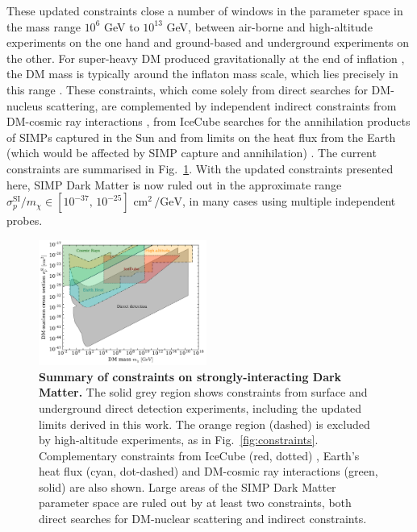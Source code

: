 \documentclass[prd,twocolumn,showpacs,nofootinbib,aps]{revtex4-1}
\begin{document}
These updated constraints close a number of windows in the parameter space in the mass range $10^6$ GeV to $10^{13}$ GeV, between air-borne and high-altitude experiments on the one hand and ground-based and underground experiments on the other. For super-heavy DM produced gravitationally at the end of inflation \cite{Hui:1998dc,Allahverdi:2002nb}, the DM mass is typically around the inflaton mass scale, which lies precisely in this range \cite{Brout:2002ec}. These constraints, which come solely from direct searches for DM-nucleus scattering, are complemented by independent indirect constraints from DM-cosmic ray interactions \cite{Cyburt2002}, from IceCube searches for the annihilation products of SIMPs captured in the Sun \cite{Albuquerque:2010bt} and from limits on the heat flux from the Earth (which would be affected by SIMP capture and annihilation) \cite{Mack:2007xj,Mack2013}. The current constraints are summarised in Fig.~\ref{fig:constraints_all}. With the updated constraints presented here, SIMP Dark Matter is now ruled out in the approximate range $\sigma_p^{\mathrm{SI}}/m_\chi \in [10^{-37},\, 10^{-25}] \,\,\mathrm{cm}^2\,/\mathrm{GeV}$, in many cases using multiple independent probes.


\begin{figure}[t]
\centering
\includegraphics[width=0.49\textwidth,]{plots/Constraints2.pdf}
\caption{\textbf{Summary of constraints on strongly-interacting Dark Matter.} The solid grey region shows constraints from surface and underground direct detection experiments, including the updated limits derived in this work. The orange region (dashed) is excluded by high-altitude experiments, as in Fig.~\ref{fig:constraints}. Complementary constraints from IceCube (red, dotted) \cite{Albuquerque:2010bt}, Earth's heat flux (cyan, dot-dashed) \cite{Mack:2007xj,Mack2013} and DM-cosmic ray interactions (green, solid) \cite{Cyburt2002} are also shown. Large areas of the SIMP Dark Matter parameter space are ruled out by at least two constraints, both direct searches for DM-nuclear scattering and indirect constraints.}
\label{fig:constraints_all}
\end{figure}
\end{document}
